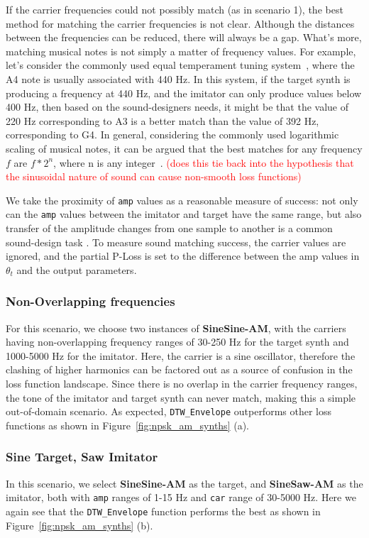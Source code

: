 \documentclass{article} %
\newcommand{\todo}[1]{\textcolor{red}{#1}}
\newcommand{\DTWEnv}{\texttt{DTW\_Envelope}\xspace}
\newcommand{\FMMod}{\textbf{SineSaw-AM}\xspace}
\newcommand{\FMModvtwo}{\textbf{SineSine-AM}\xspace}
\begin{document}
If the carrier frequencies could not possibly match (as in scenario 1), the best method for matching the carrier frequencies is not clear. Although the distances between the frequencies can be reduced, there will always be a gap. What's more, matching musical notes is not simply a matter of frequency values. For example, let's consider the commonly used equal temperament tuning system~\cite{sethares2005tuning}, where the A4 note is usually associated with 440 Hz. In this system, if the target synth is producing a frequency at 440 Hz, and the imitator can only produce values below 400 Hz, then based on the sound-designers needs, it might be that the value of 220 Hz corresponding to A3 is a better match than the value of 392 Hz, corresponding to G4. In general, considering the commonly used logarithmic scaling of musical notes, it can be argued that the best matches for any frequency $f$ are $f*2^{n}$, where n is any integer~\cite{young1939terminology}. \todo{(does this tie back into the hypothesis that the sinusoidal nature of sound can cause non-smooth loss functions)}

We take the proximity of \texttt{amp} values as a reasonable measure of success: not only can the \texttt{amp} values between the imitator and target have the same range, but also transfer of the amplitude changes from one sample to another is a common sound-design task \cite{engel2020ddsp}. To measure sound matching success, the carrier values are ignored, and the partial P-Loss is set to the difference between the amp values in $\theta_t$ and the output parameters.

\subsubsection{Non-Overlapping frequencies}
\label{sec:am_sound_matching_nonoverlapping}
For this scenario, we choose two instances of \FMModvtwo, with the carriers having non-overlapping frequency ranges of 30-250 Hz for the target synth and 1000-5000 Hz for the imitator. Here, the carrier is a sine oscillator, therefore the clashing of higher harmonics can be factored out as a source of confusion in the loss function landscape. Since there is no overlap in the carrier frequency ranges, the tone of the imitator and target synth can never match, making this a simple out-of-domain scenario. As expected, \DTWEnv outperforms other loss functions as shown in Figure~\ref{fig:npsk_am_synths} (a).

\subsubsection{Sine Target, Saw Imitator}
\label{sec:am_sinetarget_sawimitate}
In this scenario, we select \FMModvtwo as the target, and \FMMod as the imitator, both with \texttt{amp} ranges of 1-15 Hz and \texttt{car} range of 30-5000 Hz. Here we again see that the \DTWEnv function performs the best as shown in Figure~\ref{fig:npsk_am_synths} (b).
\end{document}
